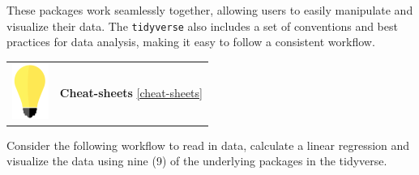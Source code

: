 \documentclass[
]{book}
\begin{document}
These packages work seamlessly together, allowing users to easily manipulate and visualize their data. The \texttt{tidyverse} also includes a set of conventions and best practices for data analysis, making it easy to follow a consistent workflow.

\hfill\break

\begin{longtable}[]{@{}
  >{\raggedright\arraybackslash}p{}
  >{\raggedright\arraybackslash}p{}@{}}
\toprule\noalign{}
\endhead
\bottomrule\noalign{}
\endlastfoot
\includegraphics[width=\textwidth,height=0.70833in]{images/01.png} & \textbf{Cheat-sheets} \ref{cheat-sheets} \\
\end{longtable}

\hfill\break

Consider the following workflow to read in data, calculate a linear regression and visualize the data using nine (9) of the underlying packages in the tidyverse.
\end{document}
